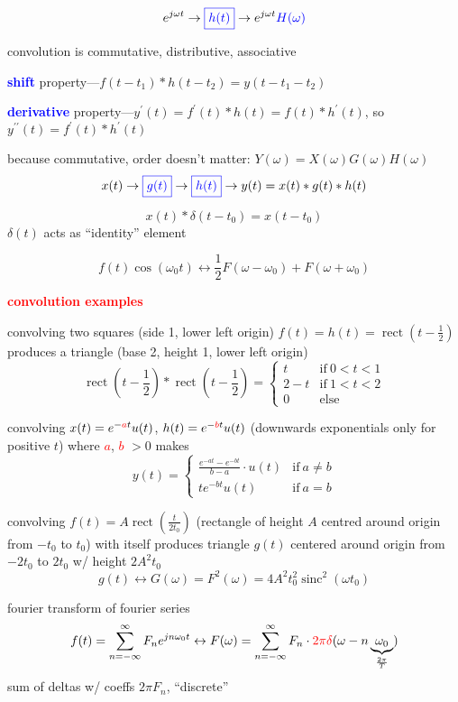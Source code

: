 \documentclass[a5paper, fleqn]{article}
\newcommand{\vocab}[1]{\textbf{\textcolor{blue}{#1}}}
\newcommand{\heading}[1]{\textbf{\textcolor{red}{#1}}}
\newcommand{\emf}[1]{\textcolor{red}{#1}}
\newcommand{\eq}[1]{\textcolor{red}{$#1$}}
\newcommand{\wrap}{\hangpara{0.5cm}{1}}
\DeclareMathOperator{\sinc}{sinc}
\DeclareMathOperator{\rect}{rect}
\begin{document}
\[e^{j\omega t} \to \textcolor{blue}{\boxed{h(t)}} \to e^{j\omega t} \textcolor{blue}{H(\omega)}\]

convolution is commutative, distributive, associative

\vocab{shift} property---$f(t - t_1) * h(t - t_2) = y(t - t_1 - t_2)$

\vocab{derivative} property---$y^\prime(t) = f^\prime(t) * h(t) = f(t) * h^\prime(t)$, so $y^{\prime\prime}(t) = f^\prime(t) * h^\prime(t)$

because commutative, order doesn't matter: $Y(\omega) = X(\omega) G(\omega) H(\omega)$
\[x(t) \to \textcolor{blue}{\boxed{g(t)}} \to \textcolor{blue}{\boxed{h(t)}} \to y(t) = x(t) * g(t) * h(t)\]

\[x(t) * \delta(t - t_0) = x(t - t_0)\]
$\delta(t)$ acts as ``identity'' element

\[f(t) \cos(\omega_0 t) \leftrightarrow \frac{1}{2} F(\omega - \omega_0) + F(\omega + \omega_0)\]

\heading{convolution examples}

\wrap convolving two squares (side 1, lower left origin) $f(t) = h(t) = \rect\left(t - \frac{1}{2}\right)$ produces a triangle (base 2, height 1, lower left origin) \[\rect\left(t - \frac{1}{2}\right) * \rect\left(t - \frac{1}{2}\right) = \begin{cases}
    t     & \text{if} ~ 0 < t < 1 \\
    2 - t & \text{if} ~ 1 < t < 2 \\
    0     & \text{else}
  \end{cases}\]

\wrap convolving $x(t) = e^{-\emf{a}t} u(t)$, $h(t) = e^{-\emf{b}t} u(t)$ (downwards exponentials only for positive $t$) where \eq{a}, \eq{b} $> 0$ makes
\[y(t) = \begin{cases}
    \frac{e^{-at} - e^{-bt}}{b - a} \cdot u(t) & \text{if}~ a \neq b \\
    te^{-bt} u(t)                              & \text{if}~ a = b
  \end{cases}\]

\wrap convolving $f(t) = A \rect\left(\frac{t}{2t_0}\right)$ (rectangle of height $A$ centred around origin from $-t_0$ to $t_0$) with itself produces triangle $g(t)$ centered around origin from $-2t_0$ to $2t_0$ w/ height $2A^2t_0$
\[g(t) \leftrightarrow G(\omega) = F^2(\omega) = 4A^2t_0^2 \sinc^2(\omega t_0)\]

fourier transform of fourier series
\[f(t) = \sum_{n = -\infty}^\infty F_n e^{jn\omega_0 t} \leftrightarrow F(\omega) = \sum_{n = -\infty}^\infty F_n \cdot \emf{2\pi \delta}(\omega - n\underbrace{\omega_0}_{\frac{2\pi}{T}})\]
sum of deltas w/ coeffs $2\pi F_n$, ``discrete''
\end{document}
